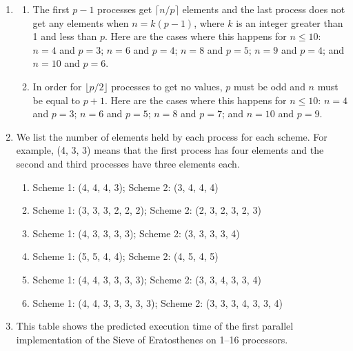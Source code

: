 \begin{enumerate}
\item \begin{enumerate}
      \item The first $p-1$ processes get $\lceil n/p \rceil$ elements and the
            last process does not get any elements when $n = k(p-1)$,
            where $k$ is an integer greater than 1 and less than $p$.
            Here are the cases where this happens for $n \le 10$:
            $n = 4$ and $p = 3$;
            $n = 6$ and $p = 4$;
            $n = 8$ and $p = 5$;
            $n = 9$ and $p = 4$; and
            $n = 10$ and $p = 6$.
      \item In order for $\lfloor p/2 \rfloor$ processes to get no values,
            $p$ must be odd and $n$ must be equal to $p+1$. Here are the
            cases where this happens for $n \le 10$:
            $n = 4$ and $p = 3$;
            $n = 6$ and $p = 5$;
            $n = 8$ and $p = 7$; and
            $n = 10$ and $p = 9$.
      \end{enumerate}

\item We list the number of elements held by each process for each scheme.
      For example, (4, 3, 3) means that the first process has four elements
      and the second and third processes have three elements each.
      \begin{enumerate}
      \item Scheme 1: (4, 4, 4, 3); Scheme 2: (3, 4, 4, 4)
      \item Scheme 1: (3, 3, 3, 2, 2, 2); Scheme 2: (2, 3, 2, 3, 2, 3)
      \item Scheme 1: (4, 3, 3, 3, 3); Scheme 2: (3, 3, 3, 3, 4)
      \item Scheme 1: (5, 5, 4, 4); Scheme 2: (4, 5, 4, 5)
      \item Scheme 1: (4, 4, 3, 3, 3, 3); Scheme 2: (3, 3, 4, 3, 3, 4)
      \item Scheme 1: (4, 4, 3, 3, 3, 3, 3); Scheme 2: (3, 3, 3, 4, 3, 3, 4)
      \end{enumerate}

\item This table shows the predicted execution time of the first
      parallel implementation of the Sieve of Eratosthenes on 1--16
      processors.


\end{enumerate}
